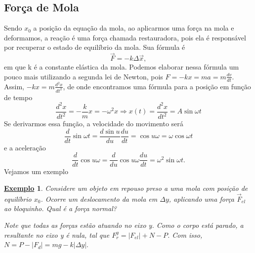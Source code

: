 \documentclass{article}
\newtheorem{example}{\underline{Exemplo}}
\begin{document}
\subsection{For\c ca de Mola}
  Sendo $x_{0}$ a posi\c c\~ao da equa\c c\~ao da mola, ao aplicarmos uma for\c ca na mola e deformamos, a rea\c c\~ao
  \'e uma for\c ca chamada restauradora, pois ela \'e respons\'avel por recuperar o estado de equil\'ibrio da mola. Sua f\'ormula \'e 
    $$
      \vec{F} = -k\Delta \vec{x},
    $$
    em que k \'e a constante el\'astica da mola. Podemos elaborar nessa f\'ormula um pouco mais utilizando a segunda lei de Newton, pois
    $F = -kx = ma = m \frac{dv}{dt}.$ Assim, $-kx = m \frac{d^{2}x}{dt^{2}}$, de onde encontramos uma f\'ormula para a posi\c c\~ao em fun\c c\~ao de tempo 
      $$
      \frac{d^{2}x}{dt^{2}} = -\frac{k}{m}x = -\omega^{2}x \Rightarrow \boxed{x(t) = \frac{d^{2}x}{dt^{2}} = A\sin{\omega t}}
      $$
      Se derivarmos essa fun\c c\~ao, a velocidade do movimento ser\'a 
        $$
        \frac{d}{dt}\sin{\omega t} = \frac{d\sin{u}}{du}\frac{du}{dt} = \cos{u}\omega = \omega \cos{\omega t}
        $$
      e a acelera\c c\~ao 
      $$
      \frac{d}{dt}\cos{u} \omega = \frac{d}{du}\cos{u}\omega \frac{du}{dt} = \omega^{2}\sin{\omega t}.
      $$
      Vejamos um exemplo
     \begin{example}
        Considere um objeto em repouso preso a uma mola com posi\c c\~ao de equil\'ibrio $x_{0}$. Ocorre um
        deslocamento da mola em $\Delta y$, aplicando uma for\c ca $\vec{F}_{el}$ ao bloquinho. Qual \'e a for\c ca normal?

        Note que todas as for\c cas est\~ao atuando no eixo y. Como o corpo est\'a parado, a resultante no eixo y \'e nula, tal que
      $F_{r}^{y} = |F_{el}| + N - P$. Com isso, $N = P - |F_{d}| = mg - k|\Delta y|.$
     \end{example}
\end{document}
